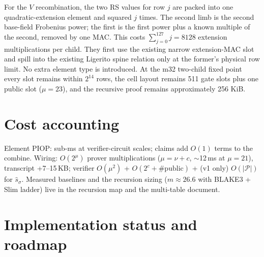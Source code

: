 \documentclass[11pt]{article}
\newcommand{\cells}{\mathcal{P}}
\theoremstyle{definition}
\begin{document}
For the $V$ recombination, the two RS values for row $j$ are packed into one
quadratic-extension element and squared $j$ times. The second limb is the
second base-field Frobenius power; the first is the first power plus a known
multiple of the second, removed by one MAC. This costs
$\sum_{j=0}^{127}j=8128$ extension multiplications per child. They first use
the existing narrow extension-MAC slot and spill into the existing Ligerito
spine relation only at the former's physical row limit. No extra element type
is introduced. At the m32 two-child fixed point every slot remains within
$2^{14}$ rows, the cell layout remains 511 gate slots plus one public slot
($\mu=23$), and the recursive proof remains approximately 256 KiB.

\section{Cost accounting}\label{sec:costs}

Element PIOP: sub-ms at verifier-circuit scales; claims add $O(1)$ terms
to the combine. Wiring: $O(2^{\mu})$ prover multiplications
($\mu = \nu + c$, $\sim$12\,ms at $\mu = 21$), transcript +7--15\,KB;
verifier $O(\mu^2)$ + $O(2^c + \#\mathrm{public})$ + (v1 only)
$O(|\cells|)$ for $\hat s_\sigma$. Measured baselines and the recursion
sizing ($m \approx 26.6$ with BLAKE3 + Slim ladder) live in the recursion
map and the multi-table document.

\section{Implementation status and roadmap}\label{sec:status}
\end{document}
